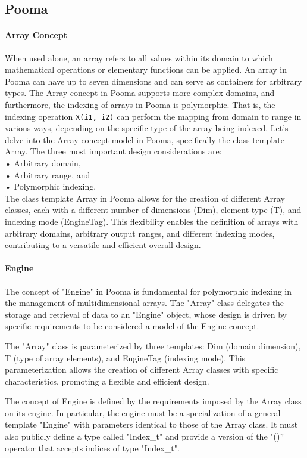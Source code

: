 \documentclass[11pt]{article}
\begin{document}
\begin{multicols*}{2}[\columnsep=1cm]
    \subsection{Pooma}
    \paragraph{Array Concept}
    When used alone, an array refers to all values within its domain to which mathematical operations or elementary functions can be applied. An array in Pooma can have up to seven dimensions and can serve as containers for arbitrary types.
    The Array concept in Pooma supports more complex domains, and furthermore, the indexing of arrays in Pooma is polymorphic. That is, the indexing operation \texttt{X(i1, i2)} can perform the mapping from domain to range in various ways, depending on the specific type of the array being indexed.
    Let's delve into the Array concept model in Pooma, specifically the class template Array.
    The three most important design considerations are:\\
    • Arbitrary domain,\\
    • Arbitrary range, and\\
    • Polymorphic indexing.\\
    The class template Array in Pooma allows for the creation of different Array classes, each with a different number of dimensions (Dim), element type (T), and indexing mode (EngineTag). This flexibility enables the definition of arrays with arbitrary domains, arbitrary output ranges, and different indexing modes, contributing to a versatile and efficient overall design.
    
    \paragraph{Engine}
    The concept of "Engine" in Pooma is fundamental for polymorphic indexing in the management of multidimensional arrays. The "Array" class delegates the storage and retrieval of data to an "Engine" object, whose design is driven by specific requirements to be considered a model of the Engine concept.

    The "Array" class is parameterized by three templates: Dim (domain dimension), T (type of array elements), and EngineTag (indexing mode). This parameterization allows the creation of different Array classes with specific characteristics, promoting a flexible and efficient design.

    The concept of Engine is defined by the requirements imposed by the Array class on its engine. In particular, the engine must be a specialization of a general template "Engine" with parameters identical to those of the Array class. It must also publicly define a type called "Index\_t" and provide a version of the "()” operator that accepts indices of type "Index\_t".


\end{multicols*}
\end{document}
